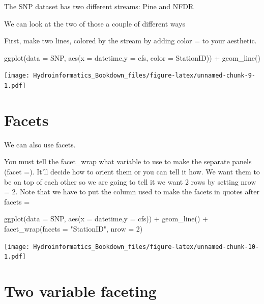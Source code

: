 \documentclass[
]{book}
\newenvironment{Shaded}{\begin{snugshade}}{\end{snugshade}}
\newcommand{\AttributeTok}[1]{\textcolor[rgb]{0.77,0.63,0.00}{#1}}
\newcommand{\DecValTok}[1]{\textcolor[rgb]{0.00,0.00,0.81}{#1}}
\newcommand{\FunctionTok}[1]{\textcolor[rgb]{0.00,0.00,0.00}{#1}}
\newcommand{\NormalTok}[1]{#1}
\newcommand{\SpecialCharTok}[1]{\textcolor[rgb]{0.00,0.00,0.00}{#1}}
\newcommand{\StringTok}[1]{\textcolor[rgb]{0.31,0.60,0.02}{#1}}
\begin{document}
The SNP dataset has two different streams: Pine and NFDR

We can look at the two of those a couple of different ways

First, make two lines, colored by the stream by adding color = to your aesthetic.

\begin{Shaded}
\begin{Highlighting}[]
\FunctionTok{ggplot}\NormalTok{(}\AttributeTok{data =}\NormalTok{ SNP, }\FunctionTok{aes}\NormalTok{(}\AttributeTok{x =}\NormalTok{ datetime,}\AttributeTok{y =}\NormalTok{ cfs, }\AttributeTok{color =}\NormalTok{ StationID)) }\SpecialCharTok{+}
  \FunctionTok{geom\_line}\NormalTok{()}
\end{Highlighting}
\end{Shaded}

\texttt{[image: Hydroinformatics\_Bookdown\_files/figure-latex/unnamed-chunk-9-1.pdf]}

\hypertarget{facets}{%
\section{Facets}\label{facets}}

We can also use facets.

You must tell the facet\_wrap what variable to use to make the separate panels (facet =). It'll decide how to orient them or you can tell it how. We want them to be on top of each other so we are going to tell it we want 2 rows by setting nrow = 2. Note that we have to put the column used to make the facets in quotes after facets =

\begin{Shaded}
\begin{Highlighting}[]
\FunctionTok{ggplot}\NormalTok{(}\AttributeTok{data =}\NormalTok{ SNP, }\FunctionTok{aes}\NormalTok{(}\AttributeTok{x =}\NormalTok{ datetime,}\AttributeTok{y =}\NormalTok{ cfs)) }\SpecialCharTok{+}
  \FunctionTok{geom\_line}\NormalTok{() }\SpecialCharTok{+}
  \FunctionTok{facet\_wrap}\NormalTok{(}\AttributeTok{facets =} \StringTok{"StationID"}\NormalTok{, }\AttributeTok{nrow =} \DecValTok{2}\NormalTok{)}
\end{Highlighting}
\end{Shaded}

\texttt{[image: Hydroinformatics\_Bookdown\_files/figure-latex/unnamed-chunk-10-1.pdf]}

\hypertarget{two-variable-faceting}{%
\section{Two variable faceting}\label{two-variable-faceting}}
\end{document}
